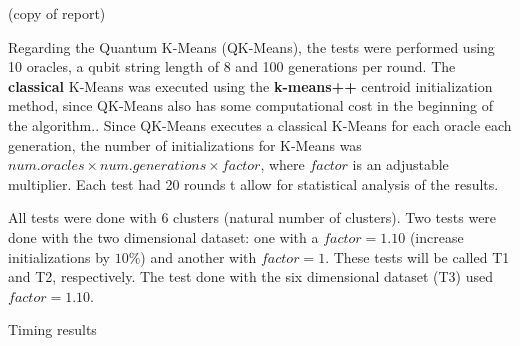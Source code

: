 (copy of report)

Regarding the Quantum K-Means (QK-Means), the tests were performed using 10 oracles, a qubit string length of 8 and 100 generations per round. The \textbf{classical} K-Means was executed using the \textbf{k-means++} centroid initialization method, since QK-Means also has some computational cost in the beginning of the algorithm.. Since QK-Means executes a classical K-Means for each oracle each generation, the number of initializations for K-Means was $num.oracles \times num.generations \times factor$, where $factor$ is an adjustable multiplier. Each test had 20 rounds t allow for statistical analysis of the results.

All tests were done with 6 clusters (natural number of clusters). Two tests were done with the two dimensional dataset: one with a $factor=1.10$ (increase initializations by $10\%$) and another with $factor=1$. These tests will be called T1 and T2, respectively. The test done with the six dimensional dataset (T3) used $factor=1.10$.

Timing results


